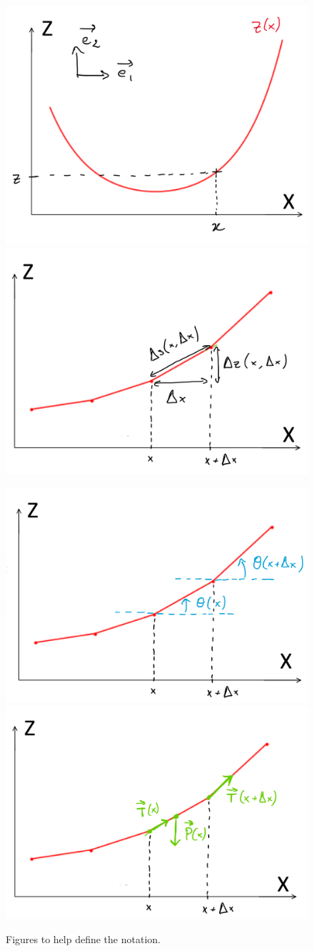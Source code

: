 \begin{figure}[h]
\centering
\includegraphics[width=.4\textwidth]{figures/graph.png}
\includegraphics[width=.4\textwidth]{figures/length.png}

\includegraphics[width=.4\textwidth]{figures/angles.png}
\includegraphics[width=.4\textwidth]{figures/forces.png}
\caption{Figures to help define the notation.}
\label{fig:notations}
\end{figure}

